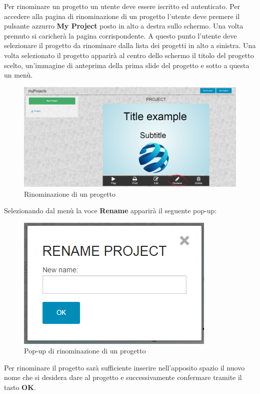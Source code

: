 Per rinominare un progetto un utente deve essere iscritto ed autenticato. Per accedere alla pagina di rinominazione di un progetto l'utente deve premere il pulsante azzurro \textbf{My Project} posto in alto a destra sullo schermo. Una volta premuto si caricherà la pagina corrispondente. A questo punto l'utente deve selezionare il progetto da rinominare dalla lista dei progetti in alto a sinistra.
Una volta selezionato il progetto apparirà al centro dello schermo il titolo del progetto scelto, un'immagine di anteprima della prima slide del progetto e sotto a questa un menù. 

\begin{figure}[H] 
	\centering 
	\includegraphics[scale=0.40] {img/rinomina_pro.png}
	\caption{Rinominazione di un progetto} 
\end{figure}

Selezionando dal menù la voce \textbf{Rename} apparirà il seguente pop-up:

\begin{figure}[H] 
	\centering 
	\includegraphics[scale=0.60] {img/rename_project.png}
	\caption{Pop-up di rinominazione di un progetto} 
\end{figure}

\noindent Per rinominare il progetto sarà sufficiente inserire nell'apposito spazio il nuovo nome che si desidera dare al progetto e successivamente confermare tramite il tasto \textbf{OK}. 